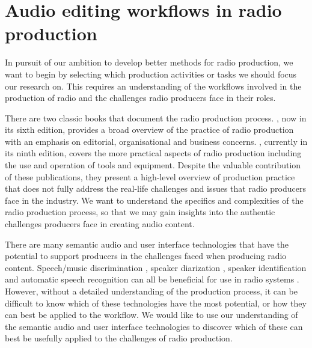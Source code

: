 \chapter{Audio editing workflows in radio production}\label{chp:ethno}


In pursuit of our ambition to develop better methods for radio production, we want to begin by selecting which
production activities or tasks we should focus our research on.  This requires an understanding of the workflows
involved in the production of radio and the challenges radio producers face in their roles.


There are two classic books that document the radio production process. \citet{McLeish2015}, now in its sixth edition,
provides a broad overview of the practice of radio production with an emphasis on editorial, organisational and
business concerns.  \citet{Hausman2012}, currently in its ninth edition, covers the more practical aspects of radio
production including the use and operation of tools and equipment.  Despite the valuable contribution of these
publications, they present a high-level overview of production practice that does not fully address the real-life
challenges and issues that radio producers face in the industry.  We want to understand the specifics and complexities
of the radio production process, so that we may gain insights into the authentic challenges producers face in creating
audio content.


There are many semantic audio and user interface technologies that have the potential to support producers in the
challenges faced when producing radio content. Speech/music discrimination \citep{Wieser2014}, speaker diarization
\citep{AngueraMiro2012}, speaker identification \citep{Lee1999a} and automatic speech recognition \citep{Junqua1995}
can all be beneficial for use in radio systems \citep{Raimond2014,Bell2015}.  However, without a detailed understanding
of the production process, it can be difficult to know which of these technologies have the most potential, or how they
can best be applied to the workflow.
We would like to use our understanding of the semantic audio and user interface technologies to discover which of these
can best be usefully applied to the challenges of radio production.

